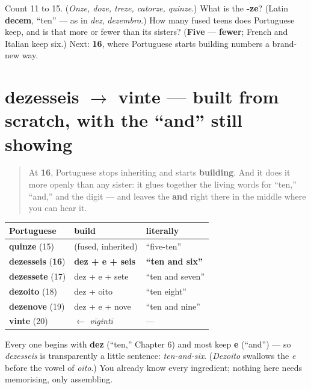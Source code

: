 \begin{tcolorbox}[breakable,colback=teal!4,colframe=teal!35!black,title={Before you move on}]
Count 11 to 15. (\emph{Onze, doze, treze, catorze, quinze}.) What is the \textbf{-ze}? (Latin \textbf{decem}, \textquotedblleft{}ten\textquotedblright{} — as in \emph{dez}, \emph{dezembro}.) How many fused teens does Portuguese keep, and is that more or fewer than its sisters? (\textbf{Five} — \textbf{fewer}; French and Italian keep six.) Next: \textbf{16}, where Portuguese starts building numbers a brand-new way.
\end{tcolorbox}
\section[dezesseis — vinte]{dezesseis $\to$ vinte — built from scratch, with the \textquotedblleft{}and\textquotedblright{} still showing}

\label{lesson:PT-C12-numeros-16-20}



\begin{quote}
At \textbf{16}, Portuguese stops inheriting and starts \textbf{building}. And it does it more openly than any sister: it glues together the living words for \textquotedblleft{}ten,\textquotedblright{} \textquotedblleft{}and,\textquotedblright{} and the digit — and leaves the \textbf{and} right there in the middle where you can hear it.
\end{quote}

\begin{grammarlens}[title={Grammar Lens: Ten AND six}]
\noindent
\begin{tabularx}{\linewidth}{@{}>{\raggedright\arraybackslash}X>{\raggedright\arraybackslash}X>{\raggedright\arraybackslash}X@{}}
\toprule
\textbf{Portuguese} & \textbf{build} & \textbf{literally} \\
\midrule
\textbf{quinze} (15) & (fused, inherited) & \textquotedblleft{}five-ten\textquotedblright{} \\
\textbf{dezesseis} (\textbf{16}) & \textbf{dez + e + seis} & \textbf{\textquotedblleft{}ten and six\textquotedblright{}} \\
\textbf{dezessete} (17) & dez + e + sete & \textquotedblleft{}ten and seven\textquotedblright{} \\
\textbf{dezoito} (18) & dez + oito & \textquotedblleft{}ten eight\textquotedblright{} \\
\textbf{dezenove} (19) & dez + e + nove & \textquotedblleft{}ten and nine\textquotedblright{} \\
\textbf{vinte} (20) & $\leftarrow$ \emph{vīgintī} & — \\
\bottomrule
\end{tabularx}

Every one begins with \textbf{dez} (\textquotedblleft{}ten,\textquotedblright{} Chapter 6) and most keep \textbf{e} (\textquotedblleft{}and\textquotedblright{}) — so \emph{dezesseis} is transparently a little sentence: \emph{ten-and-six}. (\emph{Dezoito} swallows the \emph{e} before the vowel of \emph{oito}.) You already know every ingredient; nothing here needs memorising, only assembling.
\end{grammarlens}

